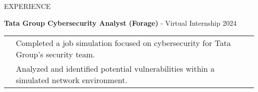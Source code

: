 \documentclass{resume}
\begin{document}
\begin{rSection}{EXPERIENCE}
    \begin{itemize}
        {\bf Tata Group Cybersecurity Analyst (Forage)} - Virtual Internship \hfill {2024}\\
        \begin{tabular}{>{\bfseries}l l}
            \textbf{} & Completed a job simulation focused on cybersecurity for Tata Group's security team. \\
            & Analyzed and identified potential vulnerabilities within a simulated network environment. \\
        \end{tabular}
    \end{itemize}
    
\end{rSection}
\end{document}
